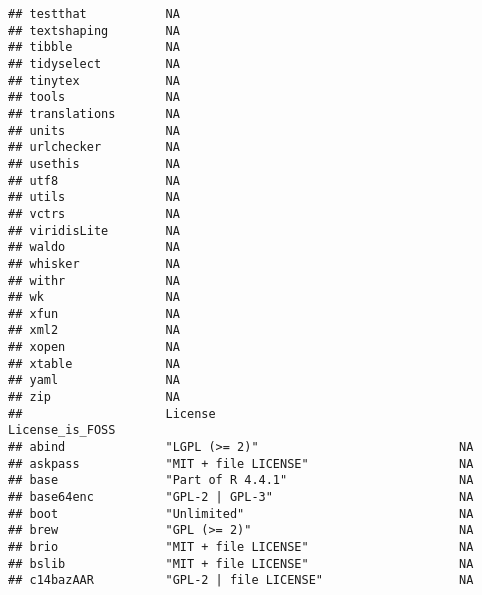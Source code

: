 \documentclass[
]{article}
\begin{document}
\begin{verbatim}
## testthat           NA                                                     
## textshaping        NA                                                     
## tibble             NA                                                     
## tidyselect         NA                                                     
## tinytex            NA                                                     
## tools              NA                                                     
## translations       NA                                                     
## units              NA                                                     
## urlchecker         NA                                                     
## usethis            NA                                                     
## utf8               NA                                                     
## utils              NA                                                     
## vctrs              NA                                                     
## viridisLite        NA                                                     
## waldo              NA                                                     
## whisker            NA                                                     
## withr              NA                                                     
## wk                 NA                                                     
## xfun               NA                                                     
## xml2               NA                                                     
## xopen              NA                                                     
## xtable             NA                                                     
## yaml               NA                                                     
## zip                NA                                                     
##                    License                                  License_is_FOSS
## abind              "LGPL (>= 2)"                            NA             
## askpass            "MIT + file LICENSE"                     NA             
## base               "Part of R 4.4.1"                        NA             
## base64enc          "GPL-2 | GPL-3"                          NA             
## boot               "Unlimited"                              NA             
## brew               "GPL (>= 2)"                             NA             
## brio               "MIT + file LICENSE"                     NA             
## bslib              "MIT + file LICENSE"                     NA             
## c14bazAAR          "GPL-2 | file LICENSE"                   NA             

\end{verbatim}
\end{document}
